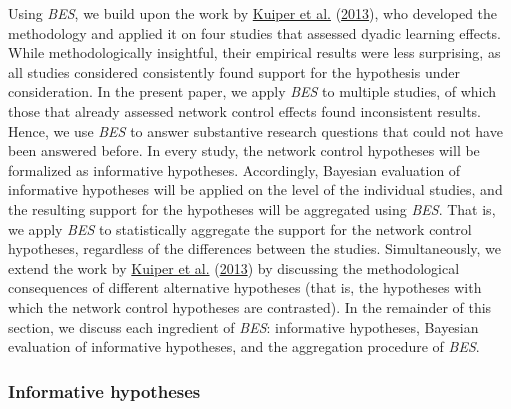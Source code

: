 \documentclass[
  11pt,
]{article}
\begin{document}
Using \emph{BES}, we build upon the work by \protect\hyperlink{ref-kuiper_combining_2013}{Kuiper et al.} (\protect\hyperlink{ref-kuiper_combining_2013}{2013}), who developed the methodology and applied it on four studies that assessed dyadic learning effects.
While methodologically insightful, their empirical results were less surprising, as all studies considered consistently found support for the hypothesis under consideration.
In the present paper, we apply \emph{BES} to multiple studies, of which those that already assessed network control effects found inconsistent results.
Hence, we use \emph{BES} to answer substantive research questions that could not have been answered before.
In every study, the network control hypotheses will be formalized as informative hypotheses.
Accordingly, Bayesian evaluation of informative hypotheses will be applied on the level of the individual studies, and the resulting support for the hypotheses will be aggregated using \emph{BES}.
That is, we apply \emph{BES} to statistically aggregate the support for the network control hypotheses, regardless of the differences between the studies.
Simultaneously, we extend the work by \protect\hyperlink{ref-kuiper_combining_2013}{Kuiper et al.} (\protect\hyperlink{ref-kuiper_combining_2013}{2013}) by discussing the methodological consequences of different alternative hypotheses (that is, the hypotheses with which the network control hypotheses are contrasted).
In the remainder of this section, we discuss each ingredient of \emph{BES}: informative hypotheses, Bayesian evaluation of informative hypotheses, and the aggregation procedure of \emph{BES}.

\hypertarget{informative-hypotheses}{%
\subsubsection{Informative hypotheses}\label{informative-hypotheses}}
\end{document}
